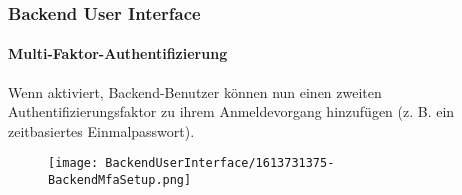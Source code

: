 %

\begin{frame}[fragile]
	\frametitle{Backend User Interface}
	\framesubtitle{Multi-Faktor-Authentifizierung}

	Wenn aktiviert, Backend-Benutzer können nun einen zweiten Authentifizierungsfaktor
	zu ihrem Anmeldevorgang hinzufügen (z. B. ein zeitbasiertes Einmalpasswort).

	\begin{figure}
		\texttt{[image: BackendUserInterface/1613731375-BackendMfaSetup.png]}
	\end{figure}

\end{frame}

